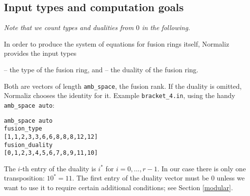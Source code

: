 \subsection{Input types and computation goals}\label{fusion_input}

\emph{Note that we count types and dualities from $0$ in the following.}

In order to  produce the system of equations for fusion rings itself, Normaliz provides the input types
\begin{itemize}
	 -- the type of the fusion ring, and
	 -- the duality of the fusion ring.
\end{itemize}

Both are vectors of length \verb*|amb_space|, the fusion rank. If the duality is omitted, Normaliz chooses the identity for it. Example \verb*|bracket_4.in|, using the handy \verb*|amb_space auto|:
\begin{Verbatim}
amb_space auto
fusion_type
[1,1,2,3,3,6,6,8,8,8,12,12]
fusion_duality
[0,1,2,3,4,5,6,7,8,9,11,10]
\end{Verbatim}
The $i$-th entry of the duality is $i^*$ for $i=0,...,r-1$. In our case there is only one transposition: $10^*= 11$. The first entry of the duality vector must be $0$ unless we want to use it to require certain additional conditions; see Section \ref{modular}.


